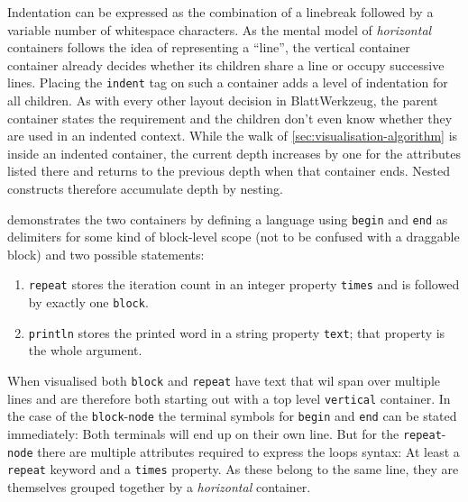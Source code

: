 \documentclass[]{report}
\begin{document}
Indentation can be expressed as the combination of a linebreak followed by a variable number of whitespace characters. As the mental model of \textit{horizontal} containers follows the idea of representing a \enquote{line}, the vertical container container already decides whether its children share a line or occupy successive lines. Placing the \texttt{indent} tag on such a container adds a level of indentation for all children. As with every other layout decision in Blatt\-Werkzeug, the parent container states the requirement and the children don't even know whether they are used in an indented context. While the walk of \cref{sec:visualisation-algorithm} is inside an indented container, the current depth increases by one for the attributes listed there and returns to the previous depth when that container ends. Nested constructs therefore accumulate depth by nesting.

 demonstrates the two containers by defining a language using \texttt{begin} and \texttt{end} as delimiters for some kind of block-level scope (not to be confused with a draggable block) and two possible statements:

\begin{enumerate}
\item \texttt{repeat} stores the iteration count in an integer property \texttt{times} and is followed by exactly one \texttt{block}.
\item \texttt{println} stores the printed word in a string property \texttt{text}; that property is the whole argument.
\end{enumerate}

When visualised both \texttt{block} and \texttt{repeat} have text that wil span over multiple lines and are therefore both starting out with a top level \texttt{vertical} container. In the case of the \texttt{block}-\texttt{node} the terminal symbols for \texttt{begin} and \texttt{end} can be stated immediately: Both terminals will end up on their own line. But for the \texttt{repeat}-\texttt{node} there are multiple attributes required to express the loops syntax: At least a \texttt{repeat} keyword and a \texttt{times} property. As these belong to the same line, they are themselves grouped together by a \textit{horizontal} container.
\end{document}
